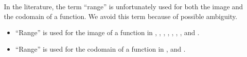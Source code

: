 \begin{remark}\label{rem:range_of_function}
  In the literature, the term \enquote{range} is unfortunately used for both the image and the codomain of a function. We avoid this term because of possible ambiguity.

  \begin{itemize}
    \item \enquote{Range} is used for the image of a function in
    \cite[76]{Bourbaki2004TheoryOfSets},
    \cite[10]{Jech2006SetTheory},
    \cite[XX]{Mendelson2015Logic},
    \cite[27]{Halmos1960NaiveSetTheory},
    \cite[40]{Enderton1977SetTheory},
    \cite[7]{Kelley1975GeneralTopology},
    \cite[20]{Schechter1997AnalysisHandbook},
    \cite[def. 2.1]{Rudin1976AnalysisPrinciples} and
    \cite[3]{DontchevRockafellar2014SolutionMappings}.

    \item \enquote{Range} is used for the codomain of a function in
    \cite[596]{Knapp2016BasicAlgebra},
    \cite[1]{Engelking1989GeneralTopology} and
    \cite[4]{Willard2004GeneralTopology}.
  \end{itemize}
\end{remark}

